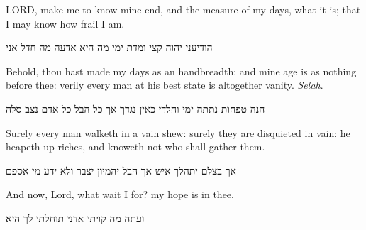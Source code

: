 \documentclass[dark]{gsf-presentation}
\newcommand{\LORD}{L{\fontsize{11}{11}\selectfont{}ORD}}
\begin{document}
\begin{frame}
	\LARGE
	\begin{english}
		\begin{center}
			\LORD{}, make me to know mine end, and
			the measure of my days, what it is; that I may
			know how frail I am.
		\end{center}
	\end{english}

	\begin{hebrew}
		\begin{center}
			הודיעני יהוה קצי ומדת ימי מה היא
			אדעה מה חדל אני
		\end{center}
	\end{hebrew}
\end{frame}

\begin{frame}
	\LARGE
	\begin{english}
		\begin{center}
			Behold, thou hast made my days as an handbreadth;
			and mine age is as nothing before thee: verily 
			every man at his best state is altogether vanity.
			\textit{Selah}.
		\end{center}
	\end{english}

	\begin{hebrew}
		\begin{center}
			הנה טפחות נתתה ימי וחלדי כאין נגדך
			אך כל הבל כל אדם נצב סלה
		\end{center}
	\end{hebrew}
\end{frame}

\begin{frame}
	\LARGE
	\begin{english}
		\begin{center}
			Surely every man walketh in a vain shew: surely
			they are disquieted in vain: he heapeth up riches,
			and knoweth not who shall gather them.
		\end{center}
	\end{english}

	\begin{hebrew}
		\begin{center}
			אך בצלם יתהלך איש אך הבל יהמיון
			יצבר ולא ידע מי אספם
		\end{center}
	\end{hebrew}
\end{frame}

\begin{frame}
	\LARGE
	\begin{english}
		\begin{center}
			And now, Lord, what wait I for? my hope is in thee.
		\end{center}
	\end{english}

	\begin{hebrew}
		\begin{center}
			ועתה מה קויתי אדני תוחלתי לך היא
		\end{center}
	\end{hebrew}
\end{frame}
\end{document}
